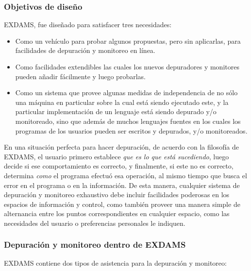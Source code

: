 \documentclass[12pt,legalpaper]{report}
\begin{document}
			\subsubsection{Objetivos de diseño}

EXDAMS, fue diseñado para satisfacer tres necesidades:
\begin{itemize}
	\item Como un vehículo para probar algunos propuestas, pero sin aplicarlas, para facilidades de depuración y monitoreo en línea.

	\item Como facilidades extendibles las cuales los nuevos depuradores y monitores pueden añadir fácilmente y luego probarlas.

	\item Como un sistema que provee algunas medidas de independencia de no sólo una máquina en particular sobre la cual está siendo ejecutado este, y la particular implementación de un lenguaje está siendo depurado y/o monitoreado, sino que además de muchos lenguajes fuentes en los cuales los programas de los usuarios pueden ser escritos y depurados, y/o monitoreados.
\end{itemize}

En una situación perfecta para hacer depuración, de acuerdo con la filosofía de EXDAMS, el usuario primero establece \textit{que es lo que está sucediendo}, luego decide si ese comportamiento es correcto, y finalmente, si este no es correcto, determina \textit{como} el programa efectuó esa operación, al mismo tiempo que busca el error en el programa o en la información.  De esta manera, cualquier sistema de depuración y monitoreo exhaustivo debe incluir facilidades poderosas en los espacios de información y control, como también proveer una manera simple de alternancia entre los puntos correspondientes en cualquier espacio, como las necesidades del usuario o preferencias personales le indiquen.

			\subsubsection[Depuración y monitoreo]{Depuración y monitoreo dentro de EXDAMS}

EXDAMS contiene dos tipos de asistencia para la depuración y monitoreo:
\end{document}
